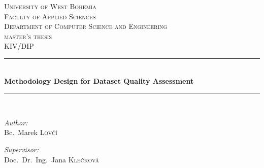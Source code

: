 \linespread{1}

\begin{titlepage}

    \newcommand{\HRule}{\rule{\linewidth}{0.5mm}} %

    \center{} %


    \textsc{\LARGE University of West Bohemia}\\[.5cm] %
    \textsc{\Large Faculty of Applied Sciences}\\[.5cm] %
    \textsc{\Large Department of Computer Science and Engineering}\\[1.5cm] %

    \textsc{\Large master's thesis}\\[0.5cm] %
    \textsc{\large KIV/DIP}\\[0.5cm] %


    \HRule{} \\[0.4cm]
    {\huge \bfseries Methodology Design for Dataset Quality Assessment}\\ %
    \HRule{} \\[1.5cm]


    \begin{minipage}[t]{0.4\textwidth}
        \begin{flushleft}
            \large \emph{Author:}\\
            Bc.\ Marek \textsc{Lovčí}
        \end{flushleft}
    \end{minipage}
    \begin{minipage}[t]{0.4\textwidth}
        \begin{flushright}
            \large \emph{Supervisor:}\\
            Doc.\ Dr.\ Ing.\ Jana \textsc{Klečková}
        \end{flushright}
    \end{minipage}\\[5.5cm] %


\end{titlepage}

